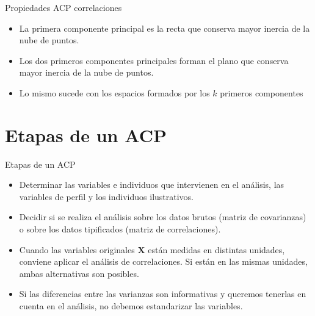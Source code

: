 \documentclass[
  ignorenonframetext,
]{beamer}
\begin{document}
\begin{frame}{Propiedades ACP correlaciones}
\protect\hypertarget{propiedades-acp-correlaciones-1}{}
\begin{itemize}
\item
  La primera componente principal es la recta que conserva mayor inercia
  de la nube de puntos.
\item
  Los dos primeros componentes principales forman el plano que conserva
  mayor inercia de la nube de puntos.
\item
  Lo mismo sucede con los espacios formados por los \(k\) primeros
  componentes
\end{itemize}
\end{frame}

\hypertarget{etapas-de-un-acp}{%
\section{Etapas de un ACP}\label{etapas-de-un-acp}}

\begin{frame}{Etapas de un ACP}
\protect\hypertarget{etapas-de-un-acp-1}{}
\begin{itemize}
\item
  Determinar las variables e individuos que intervienen en el análisis,
  las variables de perfil y los individuos ilustrativos.
\item
  Decidir si se realiza el análisis sobre los datos brutos (matriz de
  covarianzas) o sobre los datos tipificados (matriz de correlaciones).
\item
  Cuando las variables originales \(\mathbf{X}\) están medidas en
  distintas unidades, conviene aplicar el análisis de correlaciones. Si
  están en las mismas unidades, ambas alternativas son posibles.
\item
  Si las diferencias entre las varianzas son informativas y queremos
  tenerlas en cuenta en el análisis, no debemos estandarizar las
  variables.
\end{itemize}
\end{frame}
\end{document}
